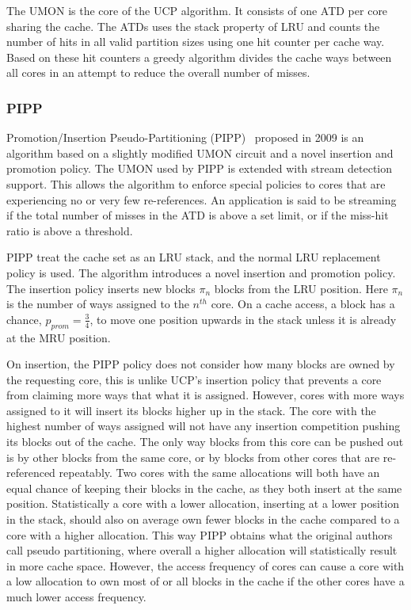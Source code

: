 The UMON is the core of the UCP algorithm.
It consists of one ATD per core sharing the cache. 
The ATDs uses the stack property of LRU and counts the number of hits in all valid partition sizes using one hit counter per cache way.
Based on these hit counters a greedy algorithm divides the cache ways between all cores in an attempt to reduce the overall number of misses.

\subsubsection{PIPP}

Promotion/Insertion Pseudo-Partitioning (PIPP)~\cite{Xie2009} proposed in 2009 is an algorithm based on a slightly modified UMON circuit and a novel insertion and promotion policy.
The UMON used by PIPP is extended with stream detection support.
This allows the algorithm to enforce special policies to cores that are experiencing no or very few re-references.
An application is said to be streaming if the total number of misses in the ATD is above a set limit, or if the miss-hit ratio is above a threshold.

PIPP treat the cache set as an LRU stack, and the normal LRU replacement policy is used.
The algorithm introduces a novel insertion and promotion policy.
The insertion policy inserts new blocks $\pi_n$ blocks from the LRU position. 
Here $\pi_n$ is the number of ways assigned to the $n^{th}$ core.
On a cache access, a block has a chance, $p_{prom} = \frac{3}{4}$, to move one position upwards in the stack unless it is already at the MRU position.

On insertion, the PIPP policy does not consider how many blocks are owned by the requesting core, this is unlike UCP's insertion policy that prevents a core from claiming more ways that what it is assigned.
However, cores with more ways assigned to it will insert its blocks higher up in the stack. 
The core with the highest number of ways assigned will not have any insertion competition pushing its blocks out of the cache.
The only way blocks from this core can be pushed out is by other blocks from the same core, or by blocks from other cores that are re-referenced repeatably.
Two cores with the same allocations will both have an equal chance of keeping their blocks in the cache, as they both insert at the same position.
Statistically a core with a lower allocation, inserting at a lower position in the stack, should also on average own fewer blocks in the cache compared to a core with a higher allocation.
This way PIPP obtains what the original authors call pseudo partitioning, where overall a higher allocation will statistically result in more cache space.
However, the access frequency of cores can cause a core with a low allocation to own most of or all blocks in the cache if the other cores have a much lower access frequency.

